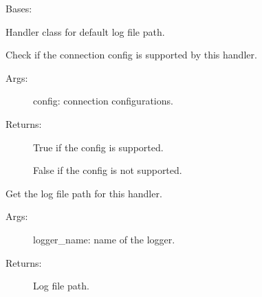 \documentclass[letterpaper,10pt,english]{sphinxmanual}
\begin{document}

\begin{fulllineitems}
\label{\detokenize{QConnectBase:QConnectBase.qlogger.QDefaultFileHandler}}
\sphinxAtStartPar
Bases: 

\sphinxAtStartPar
Handler class for default log file path.

\begin{fulllineitems}
\label{\detokenize{QConnectBase:QConnectBase.qlogger.QDefaultFileHandler.get_config_supported}}
\sphinxAtStartPar
Check if the connection config is supported by this handler.
\begin{description}
\item[{Args:}] \leavevmode
\sphinxAtStartPar
config: connection configurations.

\item[{Returns:}] \leavevmode
\sphinxAtStartPar
True if the config is supported.

\sphinxAtStartPar
False if the config is not supported.

\end{description}

\end{fulllineitems}


\begin{fulllineitems}
\label{\detokenize{QConnectBase:QConnectBase.qlogger.QDefaultFileHandler.get_log_path}}
\sphinxAtStartPar
Get the log file path for this handler.
\begin{description}
\item[{Args:}] \leavevmode
\sphinxAtStartPar
logger\_name: name of the logger.

\item[{Returns:}] \leavevmode
\sphinxAtStartPar
Log file path.

\end{description}

\end{fulllineitems}


\end{fulllineitems}
\end{document}
